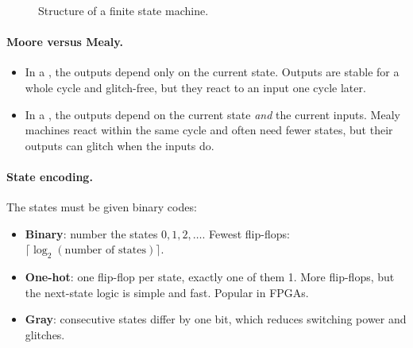 \begin{figure}[h]
\centering
{}
\caption{Structure of a finite state machine.}
\label{fig:fsmblock}
\end{figure}

\paragraph{Moore versus Mealy.}
\begin{itemize}
  \item In a , the outputs depend only on the current state. Outputs are stable for a whole cycle and glitch-free, but they react to an input one cycle later.
  \item In a , the outputs depend on the current state \emph{and} the current inputs. Mealy machines react within the same cycle and often need fewer states, but their outputs can glitch when the inputs do.
\end{itemize}

\paragraph{State encoding.} The states must be given binary codes:
\begin{itemize}
  \item \textbf{Binary}: number the states $0, 1, 2, \ldots$. Fewest flip-flops: $\lceil\log_2(\text{number of states})\rceil$.
  \item \textbf{One-hot}: one flip-flop per state, exactly one of them 1. More flip-flops, but the next-state logic is simple and fast. Popular in FPGAs.
  \item \textbf{Gray}: consecutive states differ by one bit, which reduces switching power and glitches.
\end{itemize}

